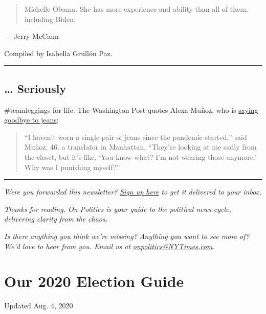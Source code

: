 \begin{quote}
Michelle Obama. She has more experience and ability than all of them,
including Biden.
\end{quote}

--- Jerry McCann

Compiled by Isabella Grullón Paz.

\begin{center}\rule{0.5\linewidth}{\linethickness}\end{center}

\hypertarget{-seriously}{%
\subsection{\ldots{} Seriously}\label{-seriously}}

\#teamleggings for life. The Washington Post quotes Alexa Muñoz, who is
\href{https://www.washingtonpost.com/business/2020/07/28/jeans-sales-leggings-pandemic/}{saying
goodbye to jeans}:

\begin{quote}
``I haven't worn a single pair of jeans since the pandemic started,''
said Muñoz, 46, a translator in Manhattan. ``They're looking at me sadly
from the closet, but it's like, `You know what? I'm not wearing those
anymore.' Why was I punishing myself?''
\end{quote}

\begin{center}\rule{0.5\linewidth}{\linethickness}\end{center}

\emph{Were you forwarded this newsletter?}
\href{https://www.nytimes3xbfgragh.onion/newsletters/politics}{\emph{Sign
up here}} \emph{to get it delivered to your inbox.}

\emph{Thanks for reading. On Politics is your guide to the political
news cycle, delivering clarity from the chaos.}

\emph{Is there anything you think we're missing? Anything you want to
see more of? We'd love to hear from you. Email us at}
\href{mailto:onpolitics@NYTimes.com}{\emph{onpolitics@NYTimes.com}}\emph{.}

\hypertarget{our-2020-election-guide}{%
\section{Our 2020 Election Guide}\label{our-2020-election-guide}}

Updated Aug. 4, 2020

